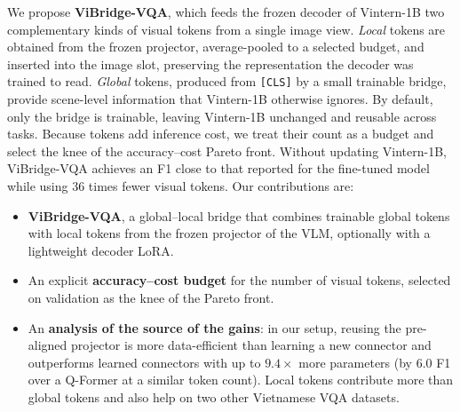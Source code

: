 We propose \textbf{ViBridge-VQA}, which feeds the frozen decoder of Vintern-1B two complementary
kinds of visual tokens from a single image view. \emph{Local} tokens are obtained from the frozen
projector, average-pooled to a selected budget, and inserted into the image slot, preserving the
representation the decoder was trained to read. \emph{Global} tokens, produced from
\texttt{[CLS]} by a small trainable bridge, provide scene-level information that Vintern-1B
otherwise ignores. By default, only the bridge is trainable, leaving Vintern-1B unchanged and
reusable across tasks. Because tokens add inference cost, we treat their count as a budget and
select the knee of the accuracy--cost Pareto front. Without updating Vintern-1B, ViBridge-VQA
achieves an F1 close to that reported for the fine-tuned model while using 36 times fewer visual
tokens.
Our contributions are:
\begin{itemize}
  \item \textbf{ViBridge-VQA}, a global--local bridge that combines trainable global tokens with
  local tokens from the frozen projector of the VLM, optionally with a lightweight decoder LoRA.
  \item An explicit \textbf{accuracy--cost budget} for the number of visual tokens, selected on
  validation as the knee of the Pareto front.
  \item An \textbf{analysis of the source of the gains}: in our setup, reusing the pre-aligned
  projector is more data-efficient than learning a new connector and outperforms learned connectors
  with up to $9.4\times$ more parameters (by 6.0 F1 over a Q-Former at a similar token count).
  Local tokens contribute more than global tokens and also help on two other Vietnamese VQA datasets.
\end{itemize}

